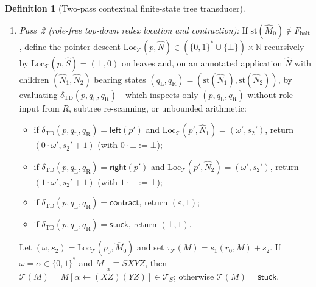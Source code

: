 \documentclass[11pt,reqno]{amsart}
\numberwithin{equation}{section}
\theoremstyle{plain}
\theoremstyle{definition}
\newtheorem{definition}[theorem]{Definition}
\theoremstyle{remark}
\newcommand{\TS}{\mathcal{T}_S}
\begin{document}
\begin{definition}[Two-pass contextual finite-state tree transducer]
\begin{enumerate}[label=(\roman*),leftmargin=2.2em]
\[    s_1(r, N_1 N_2) \;=\; 1 + s_1(r_{\mathrm{L}}, N_1) + s_1(r_{\mathrm{R}}, N_2).
  \]
  At the root of $M$, Pass~1 computes $\widehat{M}_0 = \mathrm{Ann}_{\mathcal{T}}(r_0, M)$. If $\mathrm{st}(\widehat{M}_0) \in F_{\mathrm{halt}}$, then $\mathcal{T}$ halts immediately with outcome $\mathcal{T}(M) = \mathsf{halt}$ and total transition count $\tau_{\mathcal{T}}(M) = s_1(r_0, M)$.
  \item \emph{Pass~2 (role-free top-down redex location and contraction):} If $\mathrm{st}(\widehat{M}_0) \notin F_{\mathrm{halt}}$, define the pointer descent $\mathrm{Loc}_{\mathcal{T}}(p, \widehat{N}) \in (\{0,1\}^* \cup \{\bot\}) \times \mathbb{N}$ recursively by $\mathrm{Loc}_{\mathcal{T}}(p, \widehat{S}) = (\bot, 0)$ on leaves and, on an annotated application $\widehat{N}$ with children $(\widehat{N}_1, \widehat{N}_2)$ bearing states $(q_{\mathrm{L}}, q_{\mathrm{R}}) = (\mathrm{st}(\widehat{N}_1), \mathrm{st}(\widehat{N}_2))$, by evaluating $\delta_{\mathrm{TD}}(p, q_{\mathrm{L}}, q_{\mathrm{R}})$---which inspects only $(p, q_{\mathrm{L}}, q_{\mathrm{R}})$ without role input from $R$, subtree re-scanning, or unbounded arithmetic:
  \begin{itemize}[leftmargin=1.6em]
    \item if $\delta_{\mathrm{TD}}(p, q_{\mathrm{L}}, q_{\mathrm{R}}) = \mathsf{left}(p')$ and $\mathrm{Loc}_{\mathcal{T}}(p', \widehat{N}_1) = (\omega', s_2')$, return $(0 \cdot \omega', s_2' + 1)$ (with $0 \cdot \bot := \bot$);
    \item if $\delta_{\mathrm{TD}}(p, q_{\mathrm{L}}, q_{\mathrm{R}}) = \mathsf{right}(p')$ and $\mathrm{Loc}_{\mathcal{T}}(p', \widehat{N}_2) = (\omega', s_2')$, return $(1 \cdot \omega', s_2' + 1)$ (with $1 \cdot \bot := \bot$);
    \item if $\delta_{\mathrm{TD}}(p, q_{\mathrm{L}}, q_{\mathrm{R}}) = \mathsf{contract}$, return $(\varepsilon, 1)$;
    \item if $\delta_{\mathrm{TD}}(p, q_{\mathrm{L}}, q_{\mathrm{R}}) = \mathsf{stuck}$, return $(\bot, 1)$.
  \end{itemize}
  Let $(\omega, s_2) = \mathrm{Loc}_{\mathcal{T}}(p_0, \widehat{M}_0)$ and set $\tau_{\mathcal{T}}(M) = s_1(r_0, M) + s_2$. If $\omega = \alpha \in \{0,1\}^*$ and $M|_{\alpha} \equiv S X Y Z$, then $\mathcal{T}(M) = M[\alpha \leftarrow (X Z)(Y Z)] \in \TS$; otherwise $\mathcal{T}(M) = \mathsf{stuck}$.
\end{enumerate}
\end{definition}
\end{document}
